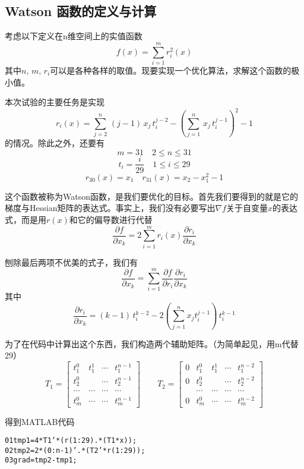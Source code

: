 \documentclass[11pt, a4paper]{article}
\begin{document}
\subsection{Watson 函数的定义与计算}
考虑以下定义在n维空间上的实值函数\[f(x)=\sum_{i=1}^m r_i^2(x)\]其中$n,\,m,\,r_i$可以是各种各样的取值。现要实现一个优化算法，求解这个函数的极小值。

本次试验的主要任务是实现\[r_i(x)=\sum_{j=2}^n\,(j-1)\,x_j\,t_i^{j-2}-\left(\sum_{j=1}^n\,x_j\,t_i^{j-1}\right)^2-1\]的情况。除此之外，还要有
\[m=31\quad 2\le n\le 31\]
\[t_i=\frac{i}{29}\quad 1\le i\le 29\]
\[r_{30}(x)=x_1\quad r_{31}(x)=x_2-x_1^2-1\]

这个函数被称为Watson函数\cite{dennis1996numerical}，是我们要优化的目标。首先我们要得到的就是它的梯度与Hessian矩阵的表达式。事实上，我们没有必要写出$\nabla f$关于自变量$x$的表达式，而是用$r(x)$和它的偏导数进行代替
\[\frac{\partial f}{\partial x_k}=2\sum_{i=1}^m r_i(x)\frac{\partial r_i}{\partial x_k}\]

刨除最后两项不优美的式子，我们有
\[\frac{\partial f}{\partial x_k}=\sum_{i=1}^m\frac{\partial f}{\partial r_i}\frac{\partial r_i}{\partial x_k}\]
其中
\[\frac{\partial r_i}{\partial x_k}=(k-1)\,t_i^{k-2}-2\left(\sum_{j=1}^nx_jt_i^{j-1}\right)\,t_i^{k-1}\]

为了在代码中计算出这个东西，我们构造两个辅助矩阵。（为简单起见，用m代替29）
\begin{equation*}
T_1=
\begin{bmatrix}
t_1^0 & t_1^1 & \cdots & t_1^{n-1}\\
t_2^0 & & \cdots & t_2^{n-1}\\
\cdots & \cdots &\cdots & \cdots\\
t_m^0 & \cdots &\cdots & t_m^{n-1}
\end{bmatrix}
\qquad 
T_2=
\begin{bmatrix}
0 & t_1^0 & t_1^1 & \cdots & t_1^{n-2}\\
0 & t_2^0 & & \cdots & t_2^{n-2}\\
& \cdots & \cdots &\cdots & \cdots\\
0 & t_m^0 & \cdots &\cdots & t_m^{n-2}
\end{bmatrix}
\end{equation*}

得到MATLAB代码

\begin{framed}
\begin{alltt}
    01	tmp1 = 4 * T1' * (r(1:29) .* (T1 * x));
    02	tmp2 = 2 * (0:n-1)' .* (T2' * r(1:29));
    03	grad = tmp2 - tmp1;
\end{alltt}
\end{framed}
\end{document}
